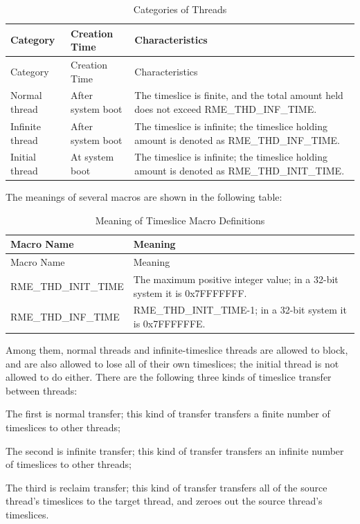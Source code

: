 \begin{xltabular}{\textwidth}{@{}>{\hsize\raggedright\arraybackslash}X>{\hsize\raggedright\arraybackslash}X>{\hsize\raggedright\arraybackslash}X@{}}
\caption{Categories of Threads}\label{tab:4-2-thread-categories}\\
\toprule
Category & Creation Time & Characteristics\tabularnewline
\endfirsthead
\toprule
Category & Creation Time & Characteristics\tabularnewline
\midrule
\endhead
\bottomrule
\endlastfoot
Normal thread & After system boot &
The timeslice is finite, and the total amount held does not exceed RME\_THD\_INF\_TIME.\tabularnewline
Infinite thread & After system boot &
The timeslice is infinite; the timeslice holding amount is denoted as RME\_THD\_INF\_TIME.\tabularnewline
Initial thread & At system boot &
The timeslice is infinite; the timeslice holding amount is denoted as RME\_THD\_INIT\_TIME.\tabularnewline
\end{xltabular}
\nopagebreak[4]

The meanings of several macros are shown in the following table:

\begin{xltabular}{\textwidth}{@{}>{\hsize\raggedright\arraybackslash}X>{\hsize\raggedright\arraybackslash}X@{}}
\caption{Meaning of Timeslice Macro Definitions}\label{tab:4-3-time-slice-macro-definitions}\\
\toprule
Macro Name & Meaning\tabularnewline
\endfirsthead
\toprule
Macro Name & Meaning\tabularnewline
\midrule
\endhead
\bottomrule
\endlastfoot
RME\_THD\_INIT\_TIME &
The maximum positive integer value; in a 32-bit system it is 0x7FFFFFFF.\tabularnewline
RME\_THD\_INF\_TIME & RME\_THD\_INIT\_TIME-1; in a 32-bit system it is 0x7FFFFFFE.\tabularnewline
\end{xltabular}
\nopagebreak[4]

Among them, normal threads and infinite-timeslice threads are allowed to block, and are also allowed to lose all of their own timeslices; the initial thread is not allowed to do either. There are the following three kinds of timeslice transfer between threads:

The first is normal transfer; this kind of transfer transfers a finite number of timeslices to other threads;

The second is infinite transfer; this kind of transfer transfers an infinite number of timeslices to other threads;

The third is reclaim transfer; this kind of transfer transfers all of the source thread's timeslices to the target thread, and zeroes out the source thread's timeslices.

